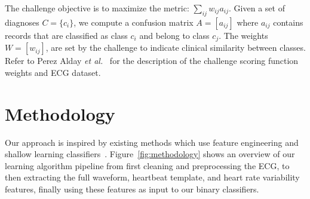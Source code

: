 \documentclass[twocolumn]{cinc}
\begin{document}
The challenge objective is to maximize the metric: $\sum_{ij} w_{ij} a_{ij}$.
Given a set of diagnoses $C = \{c_i\}$, we compute a confusion matrix $A = [a_{ij}]$ where $a_{ij}$ contains records that are classified as class $c_i$ and belong to class $c_j$.
The weights $W = [w_{ij}]$, are set by the challenge to indicate clinical similarity between classes.
Refer to Perez Alday \emph{et al.}~\cite{physionet_challenge_2020} for the description of the challenge scoring function weights and ECG dataset.

\section{Methodology}

Our approach is inspired by existing methods which use feature engineering and shallow learning classifiers~\cite{goodwin_classification_2017}.
Figure~\ref{fig:methodology} shows an overview of our learning algorithm pipeline from first cleaning and preprocessing the ECG, to then extracting the full waveform, heartbeat template, and heart rate variability features, finally using these features as input to our binary classifiers.
\end{document}
